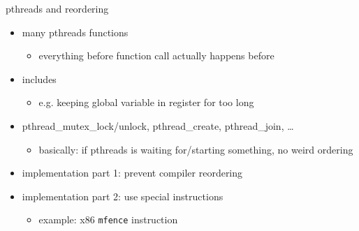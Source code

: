 \begin{frame}{pthreads and reordering}
    \begin{itemize}
    \item many pthreads functions 
        \begin{itemize}
        \item everything before function call actually happens before 
        \end{itemize}
    \item includes 
        \begin{itemize}
        \item e.g. keeping global variable in register for too long
        \end{itemize}
    \vspace{.5cm}
    \item pthread\_mutex\_lock/unlock, pthread\_create, pthread\_join, \ldots
        \begin{itemize}
        \item basically: if pthreads is waiting for/starting something, no weird ordering
        \end{itemize}
    \item implementation part 1: prevent compiler reordering
    \item implementation part 2: use special instructions
        \begin{itemize}
        \item example: x86 \texttt{mfence} instruction
        \end{itemize}
    \end{itemize}
\end{frame}

